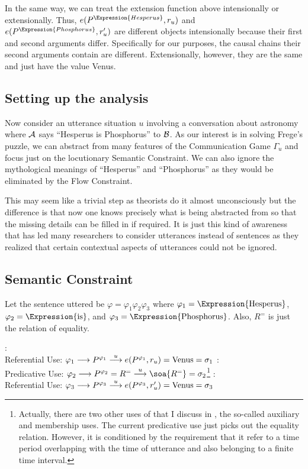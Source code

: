 In the same way, we can treat the extension function above intensionally or extensionally. Thus, $e(P^{\Expression{Hesperus}},r_u)$ and $e(P^{\Expression{Phosphorus}},r'_u)$ are different objects intensionally because their first and second arguments differ. Specifically for our purposes, the causal chains their second arguments contain are different. Extensionally, however, they are the same and just have the value Venus. 


\subsection{Setting up the analysis}

Now consider an utterance situation $u$ involving a conversation about astronomy where $\cal A$ says ``Hesperus is Phosphorus'' to $\cal B$. As our interest is in solving Frege's puzzle, we can abstract from many features of the Communication Game 
$\Gamma_u$ and focus just on the locutionary Semantic Constraint. We can also ignore the mythological meanings of ``Hesperus'' and ``Phosphorus'' as they would be eliminated by the Flow Constraint.

This may seem like a trivial step as theorists do it almost unconsciously but the difference is that now one knows precisely what is being abstracted from so that the missing details can be filled in if required. It is just this kind of awareness that has led many researchers to consider utterances instead of sentences as they realized that certain contextual aspects of utterances could not be ignored.

\subsection{Semantic Constraint}

Let the sentence uttered be $\varphi = \varphi_1\varphi_2\varphi_3$ where $\varphi_1 = \hbox{\Expression{Hesperus}}$, $\varphi_2 = \hbox{\Expression{is}}$, and $\varphi_3 = \hbox{\Expression{Phosphorus}}$. Also, $R^{=}$ is just the relation of equality.

\ea {}:\\
Referential Use: $\varphi_1 \longrightarrow P^{\varphi_1} \stackrel{u}\longrightarrow e(P^{\varphi_1},r_u) = \hbox{Venus} = \sigma_1$  
\z
\ea {}:\\
Predicative Use: $\varphi_2 \longrightarrow P^{\varphi_2} = R^{=} \stackrel{u}\longrightarrow \soa{R^{=}} = \sigma_2$\footnote{Actually, there are two other uses of  that I discuss in \citet{parikh:le}, the so-called auxiliary and membership uses. The current predicative use just picks out the equality relation. However, it is conditioned by the requirement that it refer to a time period overlapping with the time of utterance and also belonging to a finite time interval.}
\z
\ea {}:\\
Referential Use: $\varphi_3 \longrightarrow P^{\varphi_3} \stackrel{u}\longrightarrow e(P^{\varphi_3},r'_u) = \hbox{Venus} = \sigma_3$
\z



